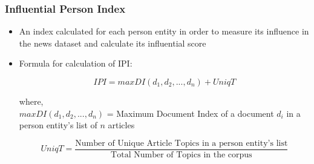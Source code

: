 \documentclass{beamer}
\begin{document}
\begin{frame}
\frametitle{Influential Person Index}
\begin{itemize}
\item
An index calculated for each person entity in order to measure its influence in the news dataset and calculate its influential score
\item
Formula for calculation of IPI:
\begin{block}{}
$$IPI= max DI(d_1, d_2, ...,d_n)+ UniqT$$
\end{block}
where, \\
 $max DI(d_1, d_2, ...,d_n)$ = Maximum Document Index of a document $d_i$ in a person entity's list of  $n$ articles

$$UniqT = \dfrac{\text{Number of Unique Article Topics in a person entity's list}}{\text{Total Number of Topics in the corpus}}$$

\end{itemize}
\end{frame}
\end{document}
